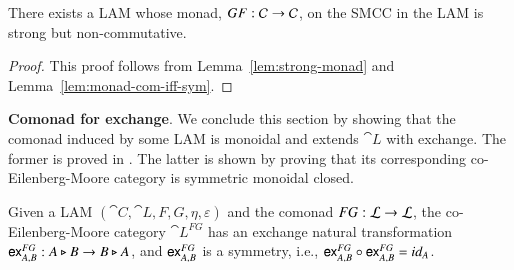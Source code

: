 \begin{theorem}
  There exists a LAM whose monad, $GF : \mathcal{C} \rightarrow \mathcal{C}$, on the SMCC
  in the LAM is strong but non-commutative.
\end{theorem}
\begin{proof}
  This proof follows from Lemma~\ref{lem:strong-monad} and
  Lemma~\ref{lem:monad-com-iff-sym}.
\end{proof}

\textbf{Comonad for exchange}.  We conclude this section by showing
that the comonad induced by some LAM is monoidal and extends $\cat{L}$
with exchange. The former is proved in \cite{kelly1974doctrinal}. The
latter is shown by proving that its corresponding co-Eilenberg-Moore
category is symmetric monoidal closed.

\begin{theorem}
  \label{thm:em-exchange}
  Given a LAM $(\cat{C},\cat{L},F,G,\eta,\varepsilon)$ and the comonad
  $FG : \mathcal{L} \rightarrow \mathcal{L}$, the co-Eilenberg-Moore category
  $\cat{L}^{FG}$ has an exchange natural transformation $\mathsf{ex}_{A,B}^{FG}:A\triangleright
  B\rightarrow B\triangleright A$, and $\mathsf{ex}_{A,B}^{FG}$ is a symmetry, i.e.,
  $\mathsf{ex}_{A,B}^{FG} \circ \mathsf{ex}_{A,B}^{FG} = id_A$.
\end{theorem}
